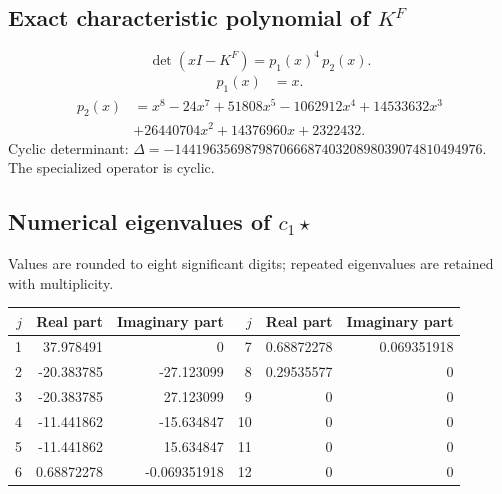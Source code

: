 \documentclass[10pt,a4paper]{article}
\begin{document}
\subsection*{Exact characteristic polynomial of $K^F$}
\[\det(xI-K^F)=p_{1}(x)^{4}\,p_{2}(x).\]
\[\begin{aligned}p_{1}(x)&=x.\end{aligned}\]
\[\begin{aligned}p_{2}(x)&=x^{8} - 24 x^{7} + 51808 x^{5} - 1062912 x^{4} + 14533632 x^{3}\\&+26440704 x^{2} + 14376960 x + 2322432.\end{aligned}\]
Cyclic determinant: $\Delta=-14419635698798706668740320898039074810494976$. The specialized operator is cyclic.
\subsection*{Numerical eigenvalues of $c_1\star$}
Values are rounded to eight significant digits; repeated eigenvalues are retained with multiplicity.
\begin{center}\small\begin{tabular}{rrr@{\qquad}rrr}\toprule $j$ & Real part & Imaginary part & $j$ & Real part & Imaginary part\\\midrule
1 & 37.978491 & 0 & 7 & 0.68872278 & 0.069351918\\
2 & -20.383785 & -27.123099 & 8 & 0.29535577 & 0\\
3 & -20.383785 & 27.123099 & 9 & 0 & 0\\
4 & -11.441862 & -15.634847 & 10 & 0 & 0\\
5 & -11.441862 & 15.634847 & 11 & 0 & 0\\
6 & 0.68872278 & -0.069351918 & 12 & 0 & 0\\
\bottomrule\end{tabular}\end{center}
\end{document}
